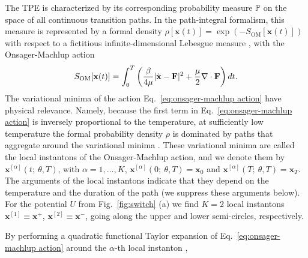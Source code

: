 {\color{red}

The TPE is characterized
by its corresponding probability measure $\mathbb{P}$ on the space
of all continuous transition paths. In the path-integral formalism,
this measure is represented by a formal density $\rho[\mathbf{x}(t)]=\exp(-S_{\text{OM}}[\mathbf{x}(t)])$
with respect to a fictitious infinite-dimensional Lebesgue measure
\citep{takahashiProbabilityFunctionalsOnsagermachlup1981}, with the
Onsager-Machlup action \citep{onsagerFluctuationsIrreversibleProcesses1953,bachFunctionalsPathsDiffusion1977,itoProbabilisticConstructionLagrangean1978}
\begin{equation}
S_{\text{OM}}[\mathbf{x}(t)]=\int_{0}^{T}\left(\frac{\beta}{4\mu}|\dot{{\bf x}}-\mathbf{F}|^{2}+\frac{\mu}{2}\nabla\cdot\mathbf{F}\right)dt.\label{eq:onsager-machlup action}
\end{equation}
The variational minima of the action Eq.~\eqref{eq:onsager-machlup action}
have physical relevance. Namely, because the first term in Eq.~\eqref{eq:onsager-machlup action}
is inversely proportional to the temperature, at sufficiently low
temperature the formal probability density $\rho$ is dominated by
paths that aggregate around the variational minima \citep{ventselSMALLRANDOMPERTURBATIONS1970,stratonovichMarkovMethodsTheory1989,grahamMacroscopicPotentialsBifurcations1989}.
These variational minima are called the local instantons of the Onsager-Machlup
action, and we denote them by $\mathbf{x}^{[\alpha]}(t;\ \theta,T)$,
with $\alpha=1,\dots,K$, $\mathbf{x}^{[\alpha]}(0;\ \theta,T)=\mathbf{x}_{0}$
and $\mathbf{x}^{[\alpha]}(T;\ \theta,T)=\mathbf{x}_{T}$. The arguments
of the local instantons indicate that they depend on the temperature
and the duration of the path (we suppress these arguments below).
For the potential $U$ from Fig.~\ref{fig:switch} (a) we find $K=2$
local instantons $\mathbf{x}^{[1]}\equiv\mathbf{x}^{+}$, $\mathbf{x}^{[2]}\equiv\mathbf{x}^{-}$,
going along the upper and lower semi-circles, respectively.

By performing a quadratic functional Taylor expansion of Eq.~\eqref{eq:onsager-machlup action}
around the $\alpha$-th local instanton \citep{engelDensityFunctionalTheory2011,gelfandCalculusVariations2012,corazzaNormalizedGaussianPath2020a},

}
